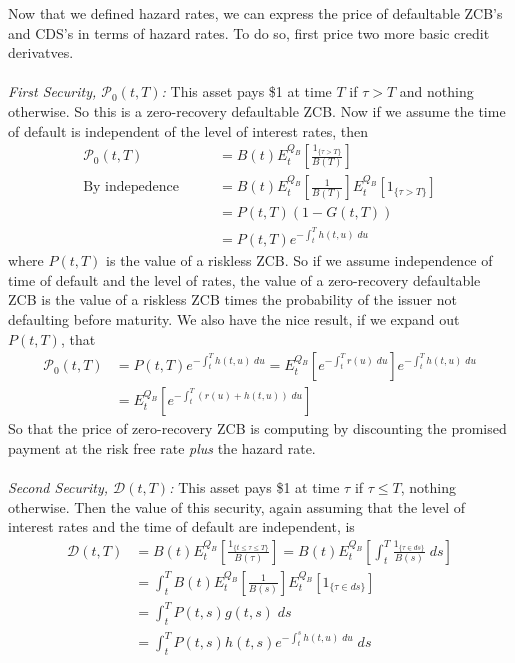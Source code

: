 \documentclass[a4paper,12pt]{scrartcl}
\begin{document}
Now that we defined hazard rates, we can express the price of 
defaultable ZCB's and CDS's in terms of hazard rates. To do so, first
price two more basic credit derivatves. 
\\
\\
{\sl First Security, $\mathcal{P}_0(t,T)$:} This asset pays \$1 at 
time $T$ if $\tau > T$ and nothing otherwise. So this is a zero-recovery
defaultable ZCB. Now if we assume
the time of default is independent of the level of interest rates, then
\begin{align*}
   \mathcal{P}_0(t,T) &= B(t) E_t^{Q_B}\left[ \frac{1_{\{\tau>T\}}}{
      B(T)} \right]\\
   \text{By indepedence} \qquad 
      &= B(t) E_t^{Q_B}\left[ \frac{1}{
      B(T)} \right] E_t^{Q_B}\left[ 1_{\{\tau>T\}}\right]\\
   &= P(t,T)(1-G(t,T))\\
   &= P(t,T) e^{-\int^T_t h(t,u) \; du}
\end{align*}
where $P(t,T)$ is the value of a riskless ZCB. So if we assume 
independence of time of default and the level of rates, the value of 
a zero-recovery defaultable ZCB is the value of a riskless ZCB times
the probability of the issuer not defaulting before maturity. We also
have the nice result, if we expand out $P(t,T)$, that
\begin{align*}
 \mathcal{P}_0(t,T) &= P(t,T) e^{-\int^T_t h(t,u) \; du} =
   E_t^{Q_B} \left[ e^{-\int^T_t r(u) \; du}\right] 
   e^{-\int^T_t h(t,u) \; du} \\
   &= E_t^{Q_B} \left[ e^{-\int^T_t (r(u)+h(t,u)) \; du}\right] 
\end{align*}  
So that the price of zero-recovery ZCB is computing by discounting
the promised payment at the risk free rate \emph{plus} the hazard rate.
\\
\\
{\sl Second Security, $\mathcal{D}(t,T)$:} This asset pays \$1 at time
$\tau$ if $\tau \leq T$, nothing otherwise. Then the value of this
security, again assuming that the level of interest rates and the time
of default are independent, is
\begin{align*}
   \mathcal{D}(t,T) &= B(t) E_t^{Q_B} \left[\frac{1_{\{ t \leq \tau 
   \leq T\}}}{B(\tau)} \right] 
   = B(t) E_t^{Q_B} \left[\int^T_t \frac{1_{\{\tau \in ds\}}}{B(s)} 
      \; ds\right] \\
   &= \int^T_t B(t) E_t^{Q_B} \left[\frac{1}{B(s)} 
      \right] E_t^{Q_B} \left[1_{\{\tau \in ds\}}\right] \\
   &= \int^T_t P(t,s) g(t,s) \; ds \\
   &= \int^T_t P(t,s) h(t,s)e^{-\int^s_t h(t,u)\; du} \; ds \\
\end{align*}
\end{document}
